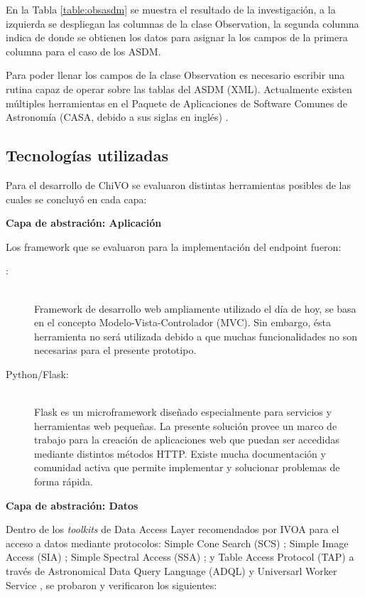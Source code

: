 En la Tabla \ref{table:obsasdm} se muestra el resultado de la investigación,
a la izquierda se despliegan las columnas de la clase Observation,
la segunda columna indica de donde se obtienen los datos para asignar la los campos
de la primera columna para el caso de los ASDM.

Para poder llenar los campos de la clase Observation es necesario escribir una
rutina capaz de operar sobre las tablas del ASDM (XML).
Actualmente existen múltiples herramientas en el Paquete de Aplicaciones de Software
Comunes de Astronomía (CASA, debido a sus siglas en inglés) \cite{petry2012analysing}.

\subsection{Tecnologías utilizadas}

Para el desarrollo de ChiVO se evaluaron distintas herramientas posibles de las
cuales se concluyó en cada capa:

\textbf{Capa de abstración: Aplicación}

Los framework que se evaluaron para la implementación del endpoint fueron:

\begin{description}
    \item[{\ror}:] \hfill \\
        Framework de desarrollo web ampliamente utilizado el día de hoy,
        se basa en el concepto Modelo-Vista-Controlador (MVC).
        Sin embargo, ésta herramienta no será utilizada debido
        a que muchas funcionalidades no son necesarias para el presente prototipo.
    \item[Python/Flask:] \hfill \\
        Flask es un microframework diseñado especialmente para servicios y
        herramientas web pequeñas.
        La presente solución provee un marco de trabajo para la creación de
        aplicaciones web que puedan ser accedidas mediante distintos métodos
        HTTP.  Existe mucha documentación y comunidad activa que permite
        implementar y solucionar problemas de forma rápida.
\end{description}

\textbf{Capa de abstración: Datos}

Dentro de los \emph{toolkits} de Data Access Layer recomendados por IVOA para
el acceso a datos mediante protocolos: Simple Cone Search (SCS)
\cite{williams2008simple}; Simple Image Access (SIA) \cite{tody2004simple};
Simple Spectral Access (SSA) \cite{tody2008simple}; y Table Access Protocol
(TAP) \cite{dowler2010table} a través de Astronomical Data Query Language (ADQL)
\cite{yasuda2004astronomical} y Universarl Worker Service
\cite{rixon2008universal}, se probaron y verificaron los siguientes:

